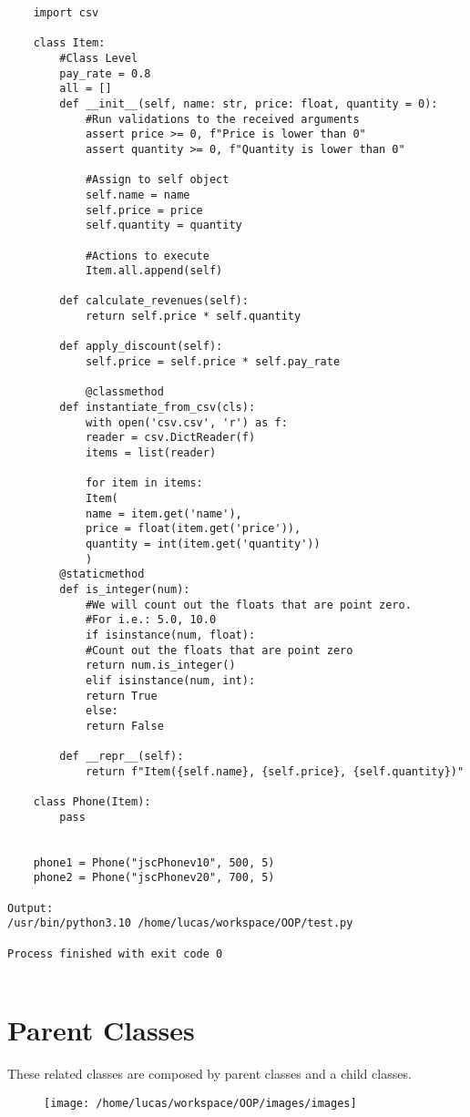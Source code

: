 \documentclass{article}
\begin{document}
\begin{lstlisting}
	import csv
	
	class Item:
		#Class Level
		pay_rate = 0.8
		all = []
		def __init__(self, name: str, price: float, quantity = 0):
			#Run validations to the received arguments
			assert price >= 0, f"Price is lower than 0"
			assert quantity >= 0, f"Quantity is lower than 0"
			
			#Assign to self object
			self.name = name
			self.price = price
			self.quantity = quantity
			
			#Actions to execute
			Item.all.append(self)
			
		def calculate_revenues(self):
			return self.price * self.quantity
			
		def apply_discount(self):
			self.price = self.price * self.pay_rate
			
			@classmethod
		def instantiate_from_csv(cls):
			with open('csv.csv', 'r') as f:
			reader = csv.DictReader(f)
			items = list(reader)
			
			for item in items:
			Item(
			name = item.get('name'),
			price = float(item.get('price')),
			quantity = int(item.get('quantity'))
			)
		@staticmethod
		def is_integer(num):
			#We will count out the floats that are point zero.
			#For i.e.: 5.0, 10.0
			if isinstance(num, float):
			#Count out the floats that are point zero
			return num.is_integer()
			elif isinstance(num, int):
			return True
			else:
			return False
		
		def __repr__(self):
			return f"Item({self.name}, {self.price}, {self.quantity})"
	
	class Phone(Item):
		pass
	
	
	phone1 = Phone("jscPhonev10", 500, 5)
	phone2 = Phone("jscPhonev20", 700, 5)
	
Output: 
/usr/bin/python3.10 /home/lucas/workspace/OOP/test.py 

Process finished with exit code 0


\end{lstlisting}

\section{Parent Classes}
These related classes are composed by parent classes and a child classes. 


\begin{figure}[ht]
	\centering
	\texttt{[image: /home/lucas/workspace/OOP/images/images]}
	\caption{}
	\label{fig:images}
\end{figure}
\end{document}
